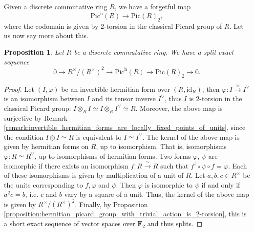 \documentclass{article}
\newtheorem{proposition}[equation]{Proposition}
\theoremstyle{definition}
\begin{document}
Given a discrete commutative ring $R$, we have a forgetful map $$\text{Pic}^\text{h}(R)\rightarrow \text{Pic}(R)_2,$$where the codomain is given by $2$-torsion in the classical Picard group of $R$. Let us now say more about this.

\begin{proposition}
    \label{proposition:split_exact_sequence_for_hermitian_picard_group_with_trivial_action}
    Let $R$ be a discrete commutative ring. We have a split exact sequence $$0\rightarrow R^\times/(R^\times)^2\rightarrow\text{Pic}^\text{h}(R)\rightarrow \text{Pic}(R)_2\rightarrow 0.$$
\end{proposition}

\begin{proof}
    \label{proof:split_exact_sequence_for_hermitian_picard_group_with_trivial_action}
    Let $(I,\varphi)$ be an invertible hermitian form over $(R,\text{id}_R)$, then $\varphi:I\xrightarrow{\simeq} I^\vee$ is an isomorphism between $I$ and its tensor inverse $I^\vee$, thus $I$ is $2$-torsion in the classical Picard group: $I\otimes_R I\simeq I\otimes_R I^\vee\simeq R$. Moreover, the above map is surjective by Remark \ref{remark:invertible_hermitian_forms_are_locally_fixed_points_of_units}, since the condition $I\otimes I\simeq R$ is equivalent to $I\simeq I^\vee$. The kernel of the above map is given by hermitian forms on $R$, up to isomorphism. That is, isomorphisms $\varphi: R\simeq R^\vee$, up to isomorphisms of hermitian forms. Two forms $\varphi$, $\psi$ are isomorphic if there exists an isomorphism $f:R\xrightarrow{\simeq} R$ such that $f^\dagger\circ\psi\circ f=\varphi$. Each of these isomorphisms is given by multiplication of a unit of $R$. Let $a,b,c\in R^\times$ be the units corresponding to $f, \varphi$ and $\psi$. Then $\varphi$ is isomorphic to $\psi$ if and only if $a^2c=b$, i.e. $c$ and $b$ vary by a square of a unit. Thus, the kernel of the above map is given by $R^\times/(R^\times)^2$. Finally, by Proposition \ref{proposition:hermitian_picard_group_with_trivial_action_is_2-torsion}, this is a short exact sequence of vector spaces over $\mathbf{F}_2$ and thus splits.
\end{proof}
\end{document}
